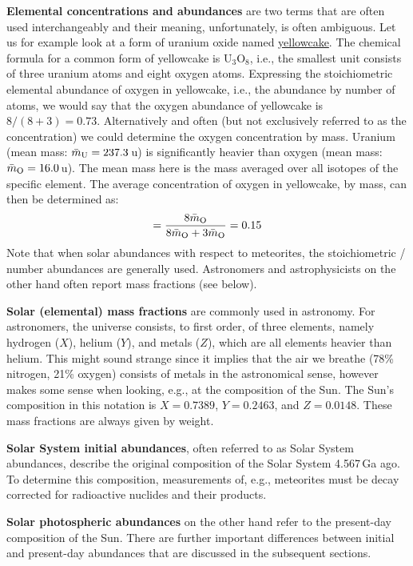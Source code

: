 \textbf{Elemental concentrations and abundances} are two terms that are often used interchangeably and their meaning, unfortunately, is often ambiguous. Let us for example look at a form of uranium oxide named \href{https://en.wikipedia.org/wiki/Yellowcake}{yellowcake}. The chemical formula for a common form of yellowcake is U$_3$O$_8$, i.e., the smallest unit consists of three uranium atoms and eight oxygen atoms. Expressing the stoichiometric elemental abundance of oxygen in yellowcake, i.e., the abundance by number of atoms, we would say that the oxygen abundance of yellowcake is $8 / (8+3) = 0.73$. Alternatively and often (but not exclusively referred to as the concentration) we could determine the oxygen concentration by mass. Uranium (mean mass: $\bar{m}_{\textnormal{U}} = 237.3$\,u) is significantly heavier than oxygen (mean mass: $\bar{m}_{\textnormal{O}} = 16.0$\,u). The mean mass here is the mass averaged over all isotopes of the specific element. The average concentration of oxygen in yellowcake, by mass, can then be determined as:
\begin{equation}
    [{\tn{O}}] = \frac{8 \bar{m}_{\tn{O}}}{8 \bar{m}_{\tn{O}} + 3 \bar{m}_{\tn{O}}} = 0.15
\end{equation}
Note that when solar abundances with respect to meteorites, the stoichiometric / number abundances are generally used. Astronomers and astrophysicists on the other hand often report mass fractions (see below).

\textbf{Solar (elemental) mass fractions} are commonly used in astronomy. For astronomers, the universe consists, to first order, of three elements, namely hydrogen ($X$), helium ($Y$), and metals ($Z$), which are all elements heavier than helium. This might sound strange since it implies that the air we breathe (78\% nitrogen, 21\% oxygen) consists of metals in the astronomical sense, however makes some sense when looking, e.g., at the composition of the Sun. The Sun's composition in this notation is $X=0.7389$, $Y=0.2463$, and $Z=0.0148$. These mass fractions are always given by weight.

\textbf{Solar System initial abundances}, often referred to as Solar System abundances, describe the original composition of the Solar System 4.567\,Ga ago. To determine this composition, measurements of, e.g., meteorites must be decay corrected for radioactive nuclides and their products.

\textbf{Solar photospheric abundances} on the other hand refer to the present-day composition of the Sun. There are further important differences between initial and present-day abundances that are discussed in the subsequent sections.

